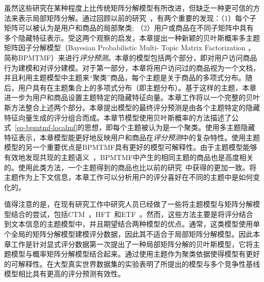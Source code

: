 虽然这些研究在某种程度上比传统矩阵分解模型有所改进，但缺乏一种更可信的方法来表示局部矩阵分解。通过回顾以前的研究~\cite{MJT11,lee2013local,lee2014local,chen2015wemarec}，有两个重要的发现：（1）每个子矩阵可以被认为是用户和商品的局部聚类; （2）用户或商品在不同子矩阵中具有多个隐藏特征表示。受这两个观察的启发，本章提出一种新颖的贝叶斯概率多主题矩阵因子分解模型（Bayesian Probabilistic Multi- Topic Matrix Factorization ，简称BPMTMF）来进行\textit{评分预测}。本章的模型包括两个部分，即对用户访问商品行为建模和对评分建模。对于第一部分，本章将用户访问过的商品视为一个文档，并且利用主题模型中主题来``聚类''商品，每个主题是关于商品的多项式分布。随后，用户具有在主题集合上的多项式分布（即主题分布）。基于这样的主题，本章进一步为用户和商品设置主题特定的隐藏特征向量。本章工作将以一个完整的贝叶斯方法整合上述两个部分。本章提出模型的最终评分预测是由各个主题特定的隐藏特征向量生成的评分组合而成。本章节模型使用贝叶斯概率的方法描述了公式~\ref{eq-bpmtmf-localmf}的思想，即每个主题被认为是一个聚类。使用多主题隐藏特征表示，本章模型能更好地反映用户和商品在\textit{评分预测}中的复杂特性。使用主题模型的另一个重要优点是BPMTMF具有更好的模型可解释性。由于主题模型能够有效地发现共现的主题语义~\cite{blei2003latent}，BPMTMF中产生的相同主题的商品也是高度相关的。使用此类方法，一个主题得到的商品也比以前的研究~\cite{MJT11,lee2013local,lee2014local,chen2015wemarec}中获得的更加一致。将主题作为上下文信息，本章工作可以分析用户的评分喜好在不同的主题中是如何变化的。

值得注意的是，在现有研究工作中研究人员已经做了一些将主题模型与矩阵分解模型结合的尝试，包括CTM~\cite{wang2011collaborative}，HFT~\cite{mcauley2013hidden}和ETF~\cite{zhang2014explicit}。然而，这些方法主要是将评分结合到文本信息的主题模型中，并且期望结合两种模型的优点。通常，这类模型使用单个全局的矩阵分解模型建模评分数据，因此其不适合于局部矩阵分解模型。因此本章工作是针对显式评分数据第一次提出了一种局部矩阵分解的贝叶斯模型，它将主题模型与概率矩阵分解模型结合起来。通过使用主题作为聚类依据使得模型有更好的可解释性。在大型真实世界数据集的实验表明了所提出的模型与多个竞争性基线模型相比具有更高的评分预测有效性。



